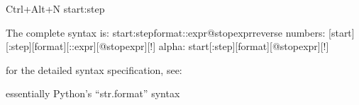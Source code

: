 \documentclass[letterpaper,12pt,english]{sphinxmanual}
\begin{document}
\begin{sphinxVerbatim}[commandchars=\\\{\}]
Ctrl+Alt+N
\PYGZlt{}start\PYGZgt{}:\PYGZlt{}step\PYGZgt{}

The complete syntax is: \PYGZlt{}start\PYGZgt{}:\PYGZlt{}step\PYGZgt{}\PYGZti{}\PYGZlt{}format\PYGZgt{}::\PYGZlt{}expr\PYGZgt{}@\PYGZlt{}stopexpr\PYGZgt{}\PYGZlt{}reverse\PYGZgt{}
numbers: [\PYGZlt{}start\PYGZgt{}][:\PYGZlt{}step\PYGZgt{}][\PYGZti{}\PYGZlt{}format\PYGZgt{}][::\PYGZlt{}expr\PYGZgt{}][@\PYGZlt{}stopexpr\PYGZgt{}][!]
alpha:   \PYGZlt{}start\PYGZgt{}[:\PYGZlt{}step\PYGZgt{}][\PYGZti{}\PYGZlt{}format\PYGZgt{}][@\PYGZlt{}stopexpr\PYGZgt{}][!]
\end{sphinxVerbatim}

for the detailed syntax specification, see:

essentially Python’s “str.format” syntax
\end{document}
